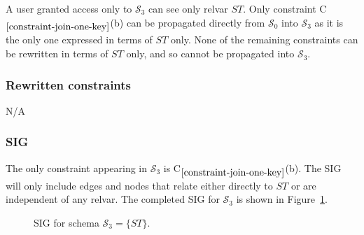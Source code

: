 \documentclass{article}
\newcommand{\RelProject}{\ensuremath{\pi}}
\newcounter{constraint}
\newcommand{\identifier}[1]{\ensuremath{\mathit{#1}}}
\newcommand{\ST}{\identifier{ST}}
\newcommand{\Sno}{\identifier{Sno}}
\newcommand{\Status}{\identifier{Status}}
\newcommand{\Type}[1]{\ensuremath{T_{#1}}}
\newcommand{\TT}[1]{\ensuremath{T_{\{#1\}}}}
\newcommand{\schema}[1]{\ensuremath{\mathcal{S}_{#1}}}
\newcommand{\Constraint}[2][]{C\ensuremath{_{#2}\ifx&#1&\else^{#1}\fi}}
\begin{document}
\noindent A user granted access only to \(\schema{3}\) can see only relvar \(\ST\). Only constraint \Constraint{\ref{constraint-join-one-key}}(b) can be propagated directly from \(\schema{0}\) into \(\schema{3}\) as it is the only one expressed in terms of \(\ST\) only. None of the remaining constraints can be rewritten in terms of \(\ST\) only, and so cannot be propagated into \(\schema{3}\).




\subsubsection{Rewritten constraints}
\label{sec-constraints-s-iii-join-one}

N/A




\subsubsection{SIG}
\label{sec-sigs-s-iii-join-one}

\noindent The only constraint appearing in \(\schema{3}\) is \Constraint{\ref{constraint-join-one-key}}(b). The SIG will only include edges and nodes that relate either directly to \(\ST\) or are independent of any relvar. The completed SIG for \(\schema{3}\) is shown in Figure~\ref{fig-sig-s-iii-join-one}.


\begin{figure}
    \centering
    \caption{SIG for schema \(\schema{3} = \{\ST\}\).}
    \label{fig-sig-s-iii-join-one}
\end{figure}
\end{document}
